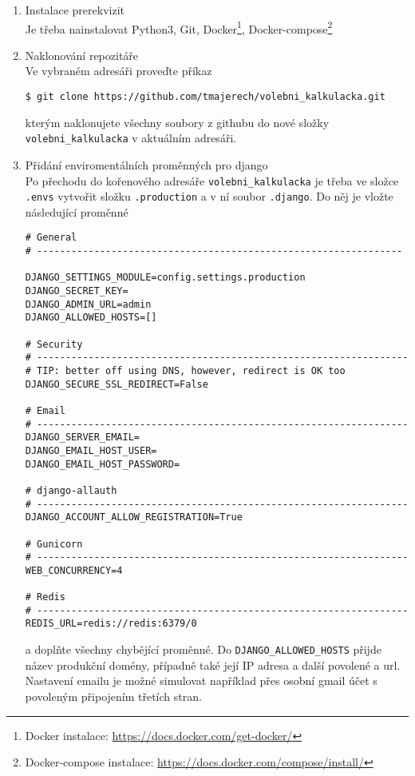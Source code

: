 \begin{enumerate}
    \item Instalace prerekvizit\\
    Je třeba nainstalovat Python3, Git, Docker\footnote{Docker instalace: \url{https://docs.docker.com/get-docker/}}, Docker-compose\footnote{Docker-compose instalace: \url{https://docs.docker.com/compose/install/}}
    
    \item Naklonování repozitáře\\
    Ve vybraném adresáři proveďte příkaz
    
    \texttt{\$ git clone https://github.com/tmajerech/volebni\_kalkulacka.git}
    
    kterým naklonujete všechny soubory z githubu do nové složky \texttt{volebni\_kalkulacka} v aktuálním adresáři.
    
    \item Přidání enviromentálních proměnných pro django\\
    Po přechodu do kořenového adresáře \texttt{volebni\_kalkulacka} je třeba ve složce \texttt{.envs} vytvořit složku \texttt{.production} a v ní soubor \texttt{.django}. Do něj je vložte následující proměnné
    \begin{verbatim}
# General
# ----------------------------------------------------------------

DJANGO_SETTINGS_MODULE=config.settings.production
DJANGO_SECRET_KEY=
DJANGO_ADMIN_URL=admin
DJANGO_ALLOWED_HOSTS=[]

# Security
# -----------------------------------------------------------------
# TIP: better off using DNS, however, redirect is OK too
DJANGO_SECURE_SSL_REDIRECT=False

# Email
# -----------------------------------------------------------------
DJANGO_SERVER_EMAIL=
DJANGO_EMAIL_HOST_USER=
DJANGO_EMAIL_HOST_PASSWORD=

# django-allauth
# -----------------------------------------------------------------
DJANGO_ACCOUNT_ALLOW_REGISTRATION=True

# Gunicorn
# -----------------------------------------------------------------
WEB_CONCURRENCY=4

# Redis
# -----------------------------------------------------------------
REDIS_URL=redis://redis:6379/0
    \end{verbatim}
    
    
a doplňte všechny chybějící proměnné. Do \texttt{DJANGO\_ALLOWED\_HOSTS} přijde název produkční domény, případně také její IP adresa a další povolené a url. Nastavení emailu je možné simulovat například přes osobní gmail účet s povoleným připojením třetích stran.


\end{enumerate}
